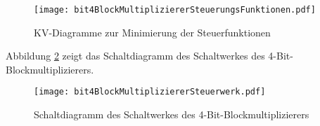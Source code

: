 \begin{figure}[htp]
	\centering
	\texttt{[image: bit4BlockMultipliziererSteuerungsFunktionen.pdf]}
	\caption{KV-Diagramme zur Minimierung der Steuerfunktionen}
	\label{blkMulStrFkt}
\end{figure}

Abbildung \ref{blkMulReal} zeigt das Schaltdiagramm des Schaltwerkes des 4-Bit-Blockmultiplizierers.

\begin{figure}[htp]
	\centering
	\texttt{[image: bit4BlockMultipliziererSteuerwerk.pdf]}
	\caption{Schaltdiagramm des Schaltwerkes des 4-Bit-Blockmultiplizierers}
	\label{blkMulReal}
\end{figure}




